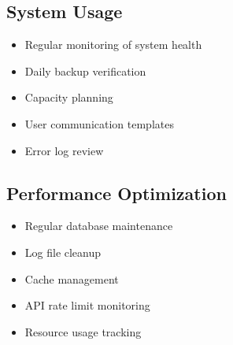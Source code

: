 \subsection{System Usage}
\begin{itemize}
    \item Regular monitoring of system health
    \item Daily backup verification
    \item Capacity planning
    \item User communication templates
    \item Error log review
\end{itemize}

\subsection{Performance Optimization}
\begin{itemize}
    \item Regular database maintenance
    \item Log file cleanup
    \item Cache management
    \item API rate limit monitoring
    \item Resource usage tracking
\end{itemize} 